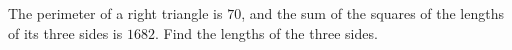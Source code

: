 The perimeter of a right triangle is $70$, and the sum of the squares of the lengths of its three sides is $1682$. Find the lengths of the three sides.
